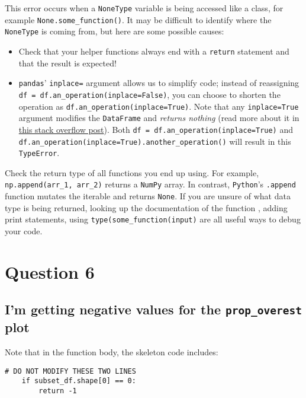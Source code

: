 \documentclass[
  letterpaper,
  DIV=11,
  numbers=noendperiod]{scrreprt}
\providecommand{\tightlist}{%
  \setlength{\itemsep}{0pt}\setlength{\parskip}{0pt}}\usepackage{longtable,booktabs,array}
\begin{document}
This error occurs when a \texttt{NoneType} variable is being accessed
like a class, for example \texttt{None.some\_function()}. It may be
difficult to identify where the \texttt{NoneType} is coming from, but
here are some possible causes:

\begin{itemize}
\tightlist
\item
  Check that your helper functions always end with a \texttt{return}
  statement and that the result is expected!
\item
  \texttt{pandas}' \texttt{inplace=} argument allows us to simplify
  code; instead of reassigning
  \texttt{df\ =\ df.an\_operation(inplace=False)}, you can choose to
  shorten the operation as \texttt{df.an\_operation(inplace=True)}. Note
  that any \texttt{inplace=True} argument modifies the
  \texttt{DataFrame} and \emph{returns nothing} (read more about it in
  \href{https://stackoverflow.com/questions/45570984/in-pandas-is-inplace-true-considered-harmful-or-not}{this
  stack overflow post}). Both
  \texttt{df\ =\ df.an\_operation(inplace=True)} and
  \texttt{df.an\_operation(inplace=True).another\_operation()} will
  result in this \texttt{TypeError}.
\end{itemize}

Check the return type of all functions you end up using. For example,
\texttt{np.append(arr\_1,\ arr\_2)} returns a \texttt{NumPy} array. In
contrast, \texttt{Python}'s \texttt{.append} function mutates the
iterable and returns \texttt{None}. If you are unsure of what data type
is being returned, looking up the documentation of the function , adding
print statements, using \texttt{type(some\_function(input)} are all
useful ways to debug your code.

\section{Question 6}\label{question-6-1}

\subsection{\texorpdfstring{I'm getting negative values for the
\texttt{prop\_overest}
plot}{I'm getting negative values for the prop\_overest plot}}\label{im-getting-negative-values-for-the-prop_overest-plot}

Note that in the function body, the skeleton code includes:

\begin{verbatim}
# DO NOT MODIFY THESE TWO LINES
    if subset_df.shape[0] == 0:
        return -1
\end{verbatim}
\end{document}
